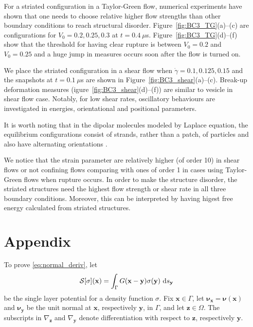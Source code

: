 \documentclass[prb,preprint,showpacs,preprintnumbers,amsmath,amssymb,longbibliography]{revtex4-1}
\newcommand{\nnu}{\boldsymbol{\nu}}
\newcommand{\xx}{\mathbf{x}}
\newcommand{\zz}{\mathbf{z}}
\newcommand{\yy}{\mathbf{y}}
\begin{document}
For a striated configuration in a Taylor-Green flow, numerical experiments have shown that one needs to choose relative higher flow strengths than other boundary conditions to reach structural disorder. Figure~\ref{fig:BC3_TG}(a)--(c) are configurations for $V_0=0.2, 0.25, 0.3$ at $t=0.4\  \mu$s.
Figure~\ref{fig:BC3_TG}(d)--(f) show that the threshold for having clear rupture is between $V_0=0.2$ and $V_0=0.25$ and a huge jump in measures occurs soon after the flow is turned on.

We place the striated configuration in a shear flow when $\dot\gamma=0.1, 0.125, 0.15$ and 
the snapshots at $t=0.1\ \mu$s are shown in Figure~\ref{fig:BC3_shear}(a)--(c).
Break-up deformation measures (igure~\ref{fig:BC3_shear}(d)--(f)) are similar to vesicle in shear flow case. Notably, for low shear rates, oscillatory behaviours are investigated in energies, orientational and positional parameters. 



It is worth noting that in the dipolar molecules modeled by
Laplace equation, the equilibrium configurations consist of strands,
rather than a patch, of particles and also have
alternating orientations \cite{}. 


We notice that the strain parameter are relatively higher (of order 10) in shear flows or not confining flows comparing with ones of order 1 in cases using Taylor-Green flows when rupture occurs. In order to make the structure disorder, the striated structures need the highest flow strength or shear rate in all three boundary conditions. Moreover, this can be interpreted by having higest free energy calculated from striated structures.


\section{Appendix}
\label{sec:appendix}
To prove \eqref{eq:normal_deriv}, let 
\begin{equation}
  \label{eq:SLP}
  \mathcal{S}[\sigma](\xx) = \int_\Gamma G(\xx-\yy) \sigma(\yy)\, \dif s_\yy
\end{equation}
be the single layer potential for a density function $\sigma.$
Fix $\xx \in \Gamma$,
let $\nnu_{\xx} = \nnu(\xx)$ and $\nnu_{\yy}$ be the unit normal at $\xx$, respectively $\yy$, in $\Gamma$,
and let $\zz \in \Omega$.  The subscripts in $\nabla_{\zz}$ and $\nabla_{\yy}$ denote
differentiation with respect to $\zz$, respectively $\yy$.
\end{document}
